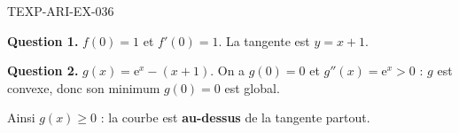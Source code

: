 \begin{corrige}{TEXP-ARI-EX-036}

\textbf{Question 1.} $f(0) = 1$ et $f'(0) = 1$. La tangente est $y = x + 1$.


\textbf{Question 2.} $g(x) = \mathrm{e}^x - (x+1)$. On a $g(0)=0$ et $g''(x) = \mathrm{e}^x > 0$ : $g$ est convexe, donc son minimum $g(0)=0$ est global.

Ainsi $g(x) \geq 0$ : la courbe est \textbf{au-dessus} de la tangente partout.

\end{corrige}
